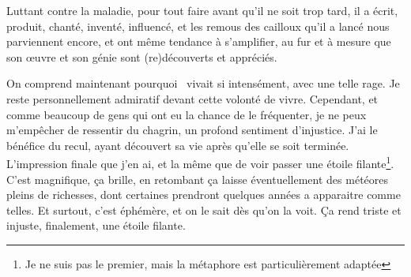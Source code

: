 Luttant contre la maladie, pour tout faire avant qu'il ne soit trop tard,
il a écrit, produit, chanté, inventé, influencé, et les remous des cailloux qu'il a lancé nous parviennent encore, et ont
même tendance à s'amplifier, au fur et à mesure que son \oe{}uvre et son génie sont (re)découverts et appréciés.


On comprend maintenant pourquoi \BV\ vivait si intensément, avec une telle rage.
Je reste personnellement admiratif devant cette volonté de vivre. Cependant, et comme
beaucoup de gens qui ont eu la chance de le fréquenter, je ne peux m'empêcher
de ressentir du chagrin, un profond sentiment d'injustice. J'ai le bénéfice du recul,
ayant découvert sa vie  après qu'elle se soit terminée. L'impression finale que j'en ai,
et la même que de voir passer une étoile filante\footnote{Je ne suis pas le premier, mais la métaphore est particulièrement
adaptée}. C'est magnifique, ça brille, en retombant ça laisse éventuellement des météores pleins de richesses, dont
certaines prendront quelques années a apparaitre comme telles. Et surtout, c'est éphémère, et on le sait dès qu'on la voit.
Ça rend triste et injuste, finalement, une étoile filante.


